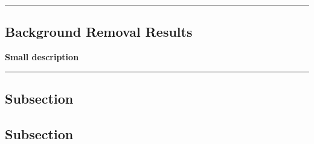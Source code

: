{\color{gray}\hrule}
\begin{center}
\section{Background Removal Results}
\textbf{Small description}
\end{center}
{\color{gray}\hrule}
\begin{multicols}{2}
\subsection{Subsection}
\lipsum[1]
\subsection{Subsection}
\lipsum[1-3]
\end{multicols}
